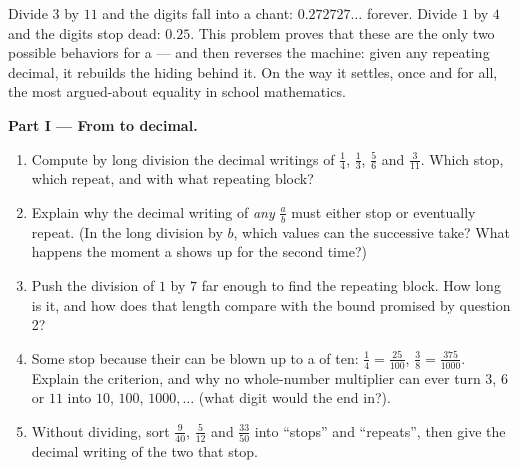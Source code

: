 \begin{problem}
\label{pb:g9:fractions:1}
Divide $3$ by $11$ and the digits fall into a chant:
$0.272727\ldots$ forever. Divide $1$ by $4$ and the digits stop
dead: $0.25$. This problem proves that these are the only two
possible behaviors for a  --- and then reverses the
machine: given any repeating decimal, it rebuilds the 
hiding behind it. On the way it settles, once and for all, the
most argued-about equality in school mathematics.

\medskip
\noindent\textbf{Part I --- From  to decimal.}
\begin{enumerate}
  \item Compute by long division the decimal writings of
        $\frac14$, $\frac13$, $\frac56$ and $\frac{3}{11}$.
        Which stop, which repeat, and with what repeating block?
  \item Explain why the decimal writing of \emph{any} 
        $\frac ab$ must either stop or eventually repeat. (In the
        long division by $b$, which values can the successive
         take? What happens the moment a 
        shows up for the second time?)
  \item Push the division of $1$ by $7$ far enough to find the
        repeating block. How long is it, and how does that length
        compare with the bound promised by question 2?
  \item Some  stop because their  can be
        blown up to a  of ten: $\frac14 =
        \frac{25}{100}$, $\frac{3}{8} = \frac{375}{1000}$.
        Explain the criterion, and why no whole-number multiplier
        can ever turn $3$, $6$ or $11$ into $10$, $100$,
        $1000, \dots$ (what digit would the  end in?).
  \item Without dividing, sort $\frac{9}{40}$, $\frac{5}{12}$ and
        $\frac{33}{50}$ into ``stops'' and ``repeats'', then give
        the decimal writing of the two that stop.
\end{enumerate}


\end{problem}
